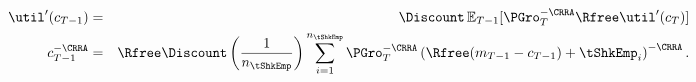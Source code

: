   \begin{eqnarray}
    \util^{\prime}({c}_{T-1})      & = & \Discount \Ex_{T-1} [\PGro_{T}^{-\CRRA}\Rfree \util^{\prime}({c}_{T})]  \label{eq:focraw}
    \\      {c}_{T-1}^{-\CRRA}  & = & \Rfree \Discount \left(\frac{1}{n_{\tShkEmp}}\right) \sum_{i=1}^{n_{\tShkEmp}} \PGro_{T}^{-\CRRA}\left(\Rfree ({m}_{T-1}-{c}_{T-1}) + \tShkEmp_{i}\right)^{-\CRRA} \label{eq:FOCTm1}.
  \end{eqnarray}

